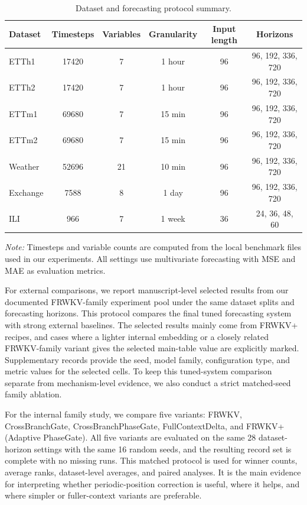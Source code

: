 \documentclass[a4paper,fleqn]{cas-sc}
\begin{document}
\begin{table}[t]
\centering
\caption{Dataset and forecasting protocol summary.}
\label{tab:dataset_summary}
\scriptsize
\setlength{\tabcolsep}{4pt}
\begin{tabular}{lccccc}
\toprule
Dataset & Timesteps & Variables & Granularity & Input length & Horizons \\
\midrule
ETTh1 & 17420 & 7 & 1 hour & 96 & 96, 192, 336, 720 \\
ETTh2 & 17420 & 7 & 1 hour & 96 & 96, 192, 336, 720 \\
ETTm1 & 69680 & 7 & 15 min & 96 & 96, 192, 336, 720 \\
ETTm2 & 69680 & 7 & 15 min & 96 & 96, 192, 336, 720 \\
Weather & 52696 & 21 & 10 min & 96 & 96, 192, 336, 720 \\
Exchange & 7588 & 8 & 1 day & 96 & 96, 192, 336, 720 \\
ILI & 966 & 7 & 1 week & 36 & 24, 36, 48, 60 \\
\bottomrule
\end{tabular}
\par\smallskip
\begin{minipage}{\textwidth}
\footnotesize \emph{Note:} Timesteps and variable counts are computed from the local benchmark files used in our experiments. All settings use multivariate forecasting with MSE and MAE as evaluation metrics.
\end{minipage}
\end{table}

For external comparisons, we report manuscript-level selected results from our documented FRWKV-family experiment pool under the same dataset splits and forecasting horizons. This protocol compares the final tuned forecasting system with strong external baselines. The selected results mainly come from FRWKV+ recipes, and cases where a lighter internal embedding or a closely related FRWKV-family variant gives the selected main-table value are explicitly marked. Supplementary records provide the seed, model family, configuration type, and metric values for the selected cells. To keep this tuned-system comparison separate from mechanism-level evidence, we also conduct a strict matched-seed family ablation.

For the internal family study, we compare five variants: FRWKV, CrossBranchGate, CrossBranchPhaseGate, FullContextDelta, and FRWKV+ (Adaptive PhaseGate). All five variants are evaluated on the same 28 dataset-horizon settings with the same 16 random seeds, and the resulting record set is complete with no missing runs. This matched protocol is used for winner counts, average ranks, dataset-level averages, and paired analyses. It is the main evidence for interpreting whether periodic-position correction is useful, where it helps, and where simpler or fuller-context variants are preferable.
\end{document}
